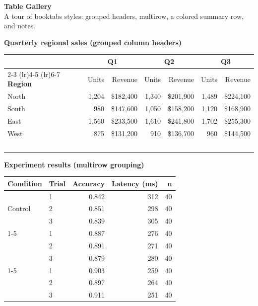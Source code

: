 \documentclass[10pt]{article}
\begin{document}
{\LARGE\bfseries\color{accent} Table Gallery}\\[0.1em]
{\large A tour of booktabs styles: grouped headers, multirow, a colored summary row, and notes.}

\vspace{1.3em}
{\bfseries\color{accent} Quarterly regional sales (grouped column headers)}

\vspace{0.5em}
\begin{tabular}{@{}l rr rr rr@{}}
\toprule
& \multicolumn{2}{c}{\bfseries Q1} & \multicolumn{2}{c}{\bfseries Q2} & \multicolumn{2}{c}{\bfseries Q3} \\
\cmidrule(lr){2-3} \cmidrule(lr){4-5} \cmidrule(lr){6-7}
\textbf{Region} & Units & Revenue & Units & Revenue & Units & Revenue \\
\midrule
North   & 1{,}204 & \$182{,}400 & 1{,}340 & \$201{,}900 & 1{,}489 & \$224{,}100 \\
South   & 980     & \$147{,}600 & 1{,}050 & \$158{,}200 & 1{,}120 & \$168{,}900 \\
East    & 1{,}560 & \$233{,}500 & 1{,}610 & \$241{,}800 & 1{,}702 & \$255{,}300 \\
West    & 875     & \$131{,}200 & 910     & \$136{,}700 & 960     & \$144{,}500 \\
\midrule
\rowcolor{summaryrow}
\textcolor{white}{\textbf{Total}} & \textcolor{white}{4{,}619} & \textcolor{white}{\$694{,}700} &
\textcolor{white}{4{,}910} & \textcolor{white}{\$738{,}600} & \textcolor{white}{5{,}271} & \textcolor{white}{\$792{,}800} \\
\bottomrule
\end{tabular}

\vspace{1.4em}
{\bfseries\color{accent} Experiment results (multirow grouping)}

\vspace{0.5em}
\begin{tabular}{@{}ll rrr@{}}
\toprule
\textbf{Condition} & \textbf{Trial} & \textbf{Accuracy} & \textbf{Latency (ms)} & \textbf{n} \\
\midrule
\multirow{3}{*}{Control}
  & 1 & 0.842 & 312 & 40 \\
  & 2 & 0.851 & 298 & 40 \\
  & 3 & 0.839 & 305 & 40 \\
\cmidrule(lr){1-5}
\multirow{3}{*}{Treatment A}
  & 1 & 0.887 & 276 & 40 \\
  & 2 & 0.891 & 271 & 40 \\
  & 3 & 0.879 & 280 & 40 \\
\cmidrule(lr){1-5}
\multirow{3}{*}{Treatment B}
  & 1 & 0.903 & 259 & 40 \\
  & 2 & 0.897 & 264 & 40 \\
  & 3 & 0.911 & 251 & 40 \\
\bottomrule
\end{tabular}
\end{document}
